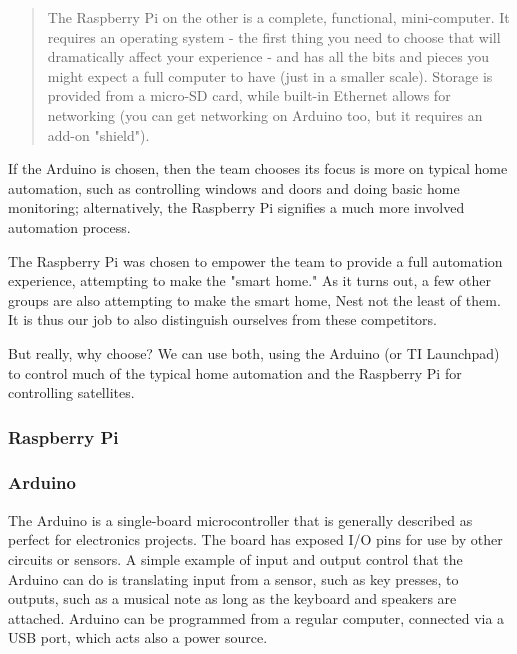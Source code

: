 \begin{multicols}{2}
\begin{quote}
			The Raspberry Pi on the other is a complete, functional, mini-computer. It requires an operating system - the first thing you need to choose that will dramatically affect your experience - and has all the bits and pieces you might expect a full computer to have (just in a smaller scale). Storage is provided from a micro-SD card, while built-in Ethernet allows for networking (you can get networking on Arduino too, but it requires an add-on "shield").
		\end{quote}
		
		If the Arduino is chosen, then the team chooses its focus is more on typical home automation, such as controlling windows and doors and doing basic home monitoring; alternatively, the Raspberry Pi signifies a much more involved automation process.
		
		The Raspberry Pi was chosen to empower the team to provide a full automation experience, attempting to make the "smart home."
		As it turns out, a few other groups are also attempting to make the smart home, Nest not the least of them.
		It is thus our job to also distinguish ourselves from these competitors.
		
		But really, why choose?
		We can use both, using the Arduino (or TI Launchpad) to control much of the typical home automation and the Raspberry Pi for controlling satellites.
	
	\subsubsection{Raspberry Pi}
	
	\subsubsection{Arduino}
	
		The Arduino is a single-board microcontroller that is generally described as perfect for electronics projects. 
		The board has exposed I/O pins for use by other circuits or sensors.
		A simple example of input and output control that the Arduino can do is translating input from a sensor, such as key presses, to outputs, such as a musical note as long as the keyboard and speakers are attached.
		Arduino can be programmed from a regular computer, connected via a USB port, which acts also a power source.
		

\end{multicols}
